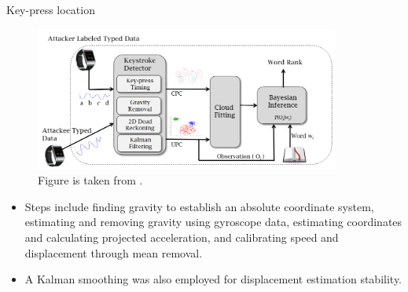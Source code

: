 \documentclass[ucs,9pt]{beamer}
\begin{document}
\begin{frame}{Key-press location}
	\begin{figure}
		\centering
		\includegraphics[width=10cm]{imgs/moleOverview}
		\caption{Figure is taken from \cite{b1}.}
	\end{figure}
	\begin{itemize}
		\item Steps include finding gravity to establish an absolute coordinate system, estimating and removing gravity using gyroscope data, estimating coordinates and calculating projected acceleration, and calibrating speed and displacement through mean removal. 
		\item A Kalman smoothing was also employed for displacement estimation stability.
	\end{itemize}
\end{frame}
\end{document}
